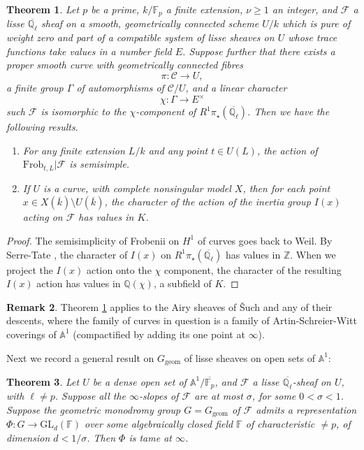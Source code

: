 \documentclass[11pt]{amsart}
\theoremstyle{plain}
\newtheorem{thm}{Theorem}
\theoremstyle{definition}
\newtheorem{rmk}[thm]{Remark}
\numberwithin{thm}{section}
\numberwithin{equation}{thm}
\newcommand{\GL}{\mathrm{GL}}
\newcommand{\sC}{{\mathcal C}}
\newcommand{\sF}{{\mathcal F}}
\newcommand{\A}{{\mathbb A}}
\newcommand{\F}{{\mathbb F}}
\newcommand{\G}{{\mathbb G}}
\newcommand{\Q}{{\mathbb Q}}
\newcommand{\Z}{{\mathbb Z}}
\newcommand{\0}{\emptyset}
\newcommand{\geo}{{\mathrm {geom}}}
\newcommand{\Frob}{\mathrm{Frob}}
\begin{document}
\begin{thm}\label{ssandI(x)}
Let $p$ be a prime, $k/\F_p$ a finite extension, $\nu \ge 1$ an integer, and $\sF$ a lisse $\overline{\Q_\ell}$ sheaf on a smooth, geometrically connected scheme $U/k$ which is pure of weight zero and part of a compatible system of lisse sheaves on $U$ whose trace functions take values in a number field $E$. Suppose further that there exists a proper smooth curve with geometrically connected fibres
$$\pi: \sC \rightarrow U,$$
a finite group $\Gamma$ of automorphisms of $\sC/U$, and a linear character 
$$\chi: \Gamma \rightarrow E^\times$$
such $\sF$ is isomorphic to the $\chi$-component of $R^1\pi_\star(\overline{\Q_\ell})$. Then we have the following results.
\begin{enumerate}[\rm(i)]
\item For any finite extension $L/k$ and any point $t \in U(L)$, the action of $\Frob_{t,L}|\sF$ is semisimple.
\item If $U$ is a curve, with complete nonsingular model $X$, then for each point $x \in X(\overline{k})\setminus U(\overline{k})$, the character
of the action of the inertia group $I(x)$ acting on $\sF$ has values in $K$.
\end{enumerate}
\end{thm}

\begin{proof}The semisimplicity of Frobenii on $H^1$ of curves goes back to Weil. By Serre-Tate \cite[Theorem 2(ii)]{Se-Ta}, the character of $I(x)$ on $R^1\pi_\star(\overline{\Q_\ell})$ has values in $\Z$. When we project the $I(x)$ action onto the $\chi$ component, the character of the resulting $I(x)$ action has values in $\Q(\chi)$,
a subfield of $K$.
\end{proof}

\begin{rmk} %
Theorem \ref{ssandI(x)} applies to the Airy sheaves of \v{S}uch \cite{Such} and any of their descents, where the family of curves in question is
a family of Artin-Schreier-Witt coverings of $\A^1$ (compactified by adding its one point at $\infty$).
\end{rmk}

Next we record a general result on $G_\geo$ of lisse sheaves on open sets of $\A^1$:

\begin{thm}\label{slope}
Let $U$ be a dense open set of $\A^1/\overline{\F_p}$, and $\sF$ a lisse $\overline{\Q_\ell}$-sheaf on $U$, with $\ell \neq p$.
Suppose all the $\infty$-slopes of 
$\sF$ are at most $\sigma$, for some $0 < \sigma < 1$. Suppose the geometric monodromy group $G=G_\geo$ of $\sF$ admits a representation
$\Phi:G \to \GL_d(\F)$ over some algebraically closed field $\F$ of characteristic $\neq p$, of dimension $d < 1/\sigma$. Then 
$\Phi$ is tame at $\infty$.
\end{thm}
\end{document}
